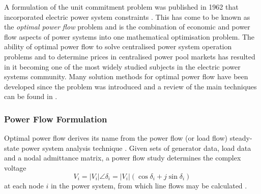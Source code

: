 A formulation of the unit commitment problem was published in 1962 that
incorporated electric power system constraints \cite{carpentier:opf}. This has
come to be known as the \textit{optimal power flow} problem and is the
combination of economic and power flow aspects of power systems into one
mathematical optimisation problem.  The ability of optimal power flow to solve
centralised power system operation problems and to determine prices in
centralised power pool markets has resulted in it becoming one of the most
widely studied subjects in the electric power systems community.  Many solution
methods for optimal power flow have been developed since the problem was
introduced and a review of the main techniques can be found in
.

\subsubsection{Power Flow Formulation}
\label{sec:pf_form}
Optimal power flow derives its name from the power flow (or load flow)
steady-state power system analysis technique \cite[\S18]{kallrath:2009}.  Given
sets of generator data, load data and a nodal admittance matrix, a power flow
study determines the complex voltage
\begin{equation}
V_i = \vert V_i \vert \angle\delta_i = \vert
V_i\vert(\cos\delta_i + j\sin\delta_i)
\end{equation}
at each node $i$ in the power system, from which line flows may be calculated
\cite{grainger:psa}.

